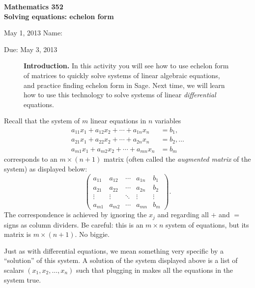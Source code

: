 \documentclass[12pt]{exam}
\theoremstyle{definition}
\begin{document}
\lstset{language=python}
\noindent
\textbf{{\large Mathematics 352 \\ Solving equations: echelon form}}

\noindent
May 1, 2013 \hfill Name: \underline{\hspace{3in}} 

\noindent
Due: May 3, 2013

\noindent
\begin{figure}[h]
\centering
\begin{minipage}[b]{0.85\linewidth}
\textbf{Introduction.} In this activity you will see how to use echelon form of matrices to quickly solve systems of linear algebraic equations, and practice finding echelon form in Sage. Next time, we will learn how to use this technology to solve systems of linear \emph{differential} equations.
\end{minipage}
\end{figure}

Recall that the system of $m$ linear equations in $n$ variables
\begin{align*}
    a_{11} x_{1} + a_{12} x_{2} + \cdots + a_{1n} x_{n} &= b_{1},  \\
    a_{21} x_{1} + a_{22} x_{2} + \cdots + a_{2n} x_{n} &= b_{2},\ldots  \\
    a_{m1} x_{1} + a_{m2} x_{2} + \cdots + a_{mn} x_{n} &= b_{m}
\end{align*}
corresponds to an $m \times (n + 1)$ matrix (often called the \emph{augmented matrix} of the system) as displayed below: 
\[
    \begin{pmatrix}
        a_{11} & a_{12} & \cdots & a_{1n} & b_1 \\
        a_{21} & a_{22} & \cdots & a_{2n} & b_2 \\
        \vdots & \vdots & \ddots & \vdots & \vdots \\
        a_{m1} & a_{m2} & \cdots & a_{mn} & b_m 
    \end{pmatrix}.
\]
The correspondence is achieved by ignoring the $x_{j}$ and regarding all $+$ and $=$ signs as column dividers. Be careful: this is an $m \times n$ system of equations, but its matrix is $m \times (n + 1)$. No biggie.

Just as with differential equations, we mean something very specific by a ``solution'' of this system. A solution of the system displayed above is a list of scalars $(x_1, x_2, \ldots, x_n)$ such that plugging in makes all the equations in the system true.
\end{document}
